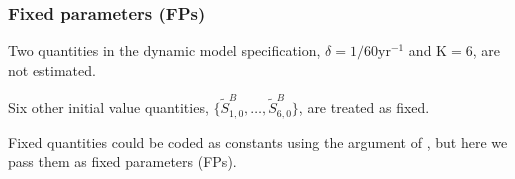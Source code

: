 \begin{frame}[fragile]

\frametitle{Fixed parameters (FPs)}
\bi
\item 
Two quantities in the dynamic model specification, $\delta=1/60 \mathrm{yr}^{-1}$ and $\mathrm{K}=6$, are not estimated.
\item Six other initial value quantities, $\{\tilde S^B_{1,0},\dots,\tilde S^B_{6,0}\}$, are treated as fixed.

\item Fixed quantities could be coded as constants using the  argument of , but here we pass them as fixed parameters (FPs).
\ei

\begin{knitrout}\small
{}\color{fgcolor}\begin{kframe}
\begin{alltt}
 \hlkwb{<-} \hlstd{(}\hlstd{,}\hlstd{,}
  \hlstd{,}\hlstd{,}\hlstd{,}\hlstd{,}\hlstd{,}\hlstd{)}
 \hlkwb{<-} 
 \hlkwb{<-} \hlstd{(}\hlopt{-}\hlopt{<}\hlstd{)}
 \hlkwb{<-} \hlstd{[}\hlopt{-}\hlopt{:}\hlstd{]}
 \hlkwb{<-} \hlstd{(}\hlstd{,}\hlstd{,}
  \hlstd{,}\hlstd{,}\hlstd{,}\hlstd{)}
 \hlkwb{<-} \hlstd{(}\hlstd{=}\hlopt{/}\hlstd{,}
\end{alltt}
\end{kframe}
\end{knitrout}

\end{frame}

